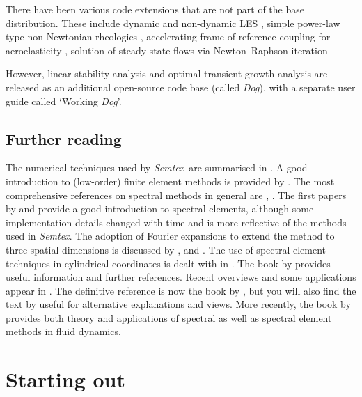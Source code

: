 \documentclass[11pt]{report}
\newcommand{\Semtex}{\emph{Semtex}} \newcommand{\Dog}{\emph{Dog}}
\begin{document}
There have been various code extensions that are not part of the base
distribution. These include dynamic and non-dynamic LES
\citep{blsc03}, simple power-law type non-Newtonian rheologies
\citep{rb06}, accelerating frame of reference coupling for
aeroelasticity \citep{bh96a,bh99,bgw01,hmb03}, solution of
steady-state flows via Newton--Raphson iteration \citep{hmb02a}

However, linear stability analysis
\citep{hmb02a,bllo03b,bllo03a,bml05,shbl05,ebs06,blsh07} and optimal
transient growth analysis \citep{bbs08a} are released as an additional
open-source code base (called \Dog), with a separate user guide
called `Working \Dog'.

\section{Further reading}

The numerical techniques used by \Semtex\ are summarised in
\citet{blas19}.  A good introduction to (low-order) finite element
methods is provided by \citet{hughes87}.  The most comprehensive
references on spectral methods in general are \citet{gs77},
\citet{chqz88,chqz06}.  The first papers by \citet{pat84} and
\citet{kp86} provide a good introduction to spectral elements,
although some implementation details changed with time and
\citet{mt89} is more reflective of the methods used in \Semtex.  The
adoption of Fourier expansions to extend the method to three spatial
dimensions is discussed by \citet{ap89}, \citet{kar89} and
\citet{kar90}.  The use of spectral element techniques in cylindrical
coordinates is dealt with in \citet{blsh04}.  The book by
\citet{fun97} provides useful information and further references.
Recent overviews and some applications appear in \citet{kh98,hen99b}.
The definitive reference is now the book by \citet{kars05}, but you
will also find the text by \citet*{dfm02} useful for alternative
explanations and views. More recently, the book by \citet{chqz07}
provides both theory and applications of spectral as well as spectral
element methods in fluid dynamics.

\chapter{Starting out}
\label{ch.start}

\end{document}
